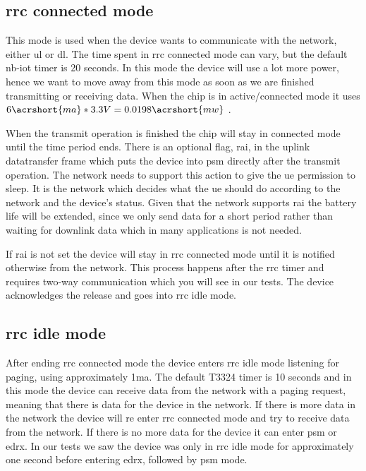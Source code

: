 \documentclass[USenglish]{ifimaster}  %
\begin{document}
\subsection{\acrshort{rrc} connected mode} \label{ssection:rrc}
This mode is used when the device wants to communicate with the network, either \acrshort{ul} or \acrshort{dl}. The time spent in \acrshort{rrc} connected mode can vary, but the default \acrshort{nb-iot} timer is 20 seconds. In this mode the device will use a lot more power, hence we want to move away from this mode as soon as we are finished transmitting or receiving data. When the chip is in active/connected mode it uses ${6 \acrshort{ma} * 3.3V = 0.0198 \acrshort{mw}}$ \cite{datasheet:ubloxchip}.

When the transmit operation is finished the chip will stay in connected mode until the time period ends. There is an optional flag, \acrfull{rai}, in the uplink datatransfer frame which puts the device into \acrshort{psm} directly after the transmit operation. The network needs to support this action to give the \acrshort{ue} permission to sleep. It is the network which decides what the \acrshort{ue} should do according to the network and the device's status. Given that the network supports \acrshort{rai} the battery life will be extended, since we only send data for a short period rather than waiting for downlink data which in many applications is not needed.

If \acrshort{rai} is not set the device will stay in \acrshort{rrc} connected mode until it is notified otherwise from the network. This process happens after the \acrshort{rrc} timer and requires two-way communication which you will see in our tests. The device acknowledges the release and goes into \acrshort{rrc} idle mode.

\subsection{\acrshort{rrc} idle mode}
After ending \acrshort{rrc} connected mode the device enters \acrshort{rrc} idle mode listening for paging, using approximately 1\acrshort{ma}. The default \acrfull{T3324} timer is 10 seconds and in this mode the device can receive data from the network with a paging request, meaning that there is data for the device in the network. If there is more data in the network the device will re enter \acrshort{rrc} connected mode and try to receive data from the network. If there is no more data for the device it can enter \acrshort{psm} or \acrshort{edrx}. In our tests we saw the device was only in \acrshort{rrc} idle mode for approximately one second before entering \acrshort{edrx}, followed by \acrshort{psm} mode.
\end{document}
